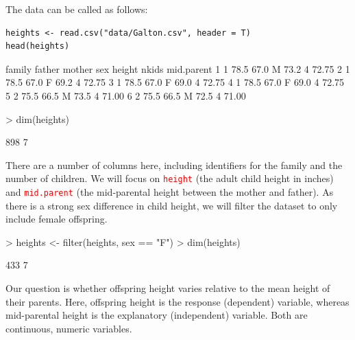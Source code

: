\documentclass[a4paper,12pt]{article}
\newcommand\code[1]{\textcolor{red}{\texttt{#1}}}
\begin{document}
The data can be called as follows:

\begin{shaded}
\begin{verbatim}
heights <- read.csv("data/Galton.csv", header = T)
head(heights)
\end{verbatim}
\begin{Schunk}
\begin{Soutput}
  family father mother sex height nkids mid.parent
1      1   78.5   67.0   M   73.2     4      72.75
2      1   78.5   67.0   F   69.2     4      72.75
3      1   78.5   67.0   F   69.0     4      72.75
4      1   78.5   67.0   F   69.0     4      72.75
5      2   75.5   66.5   M   73.5     4      71.00
6      2   75.5   66.5   M   72.5     4      71.00
\end{Soutput}
\end{Schunk}
\begin{Schunk}
\begin{Sinput}
> dim(heights)
\end{Sinput}
\begin{Soutput}
[1] 898   7
\end{Soutput}
\end{Schunk}
\end{shaded}


There are a number of columns here, including identifiers for the family and the number of children. We will focus on \code{height} (the adult child height in inches) and \code{mid.parent} (the mid-parental height between the mother and father). As there is a strong sex difference in child height, we will filter the dataset to only include female offspring.

\begin{shaded}
\begin{Schunk}
\begin{Sinput}
> heights <- filter(heights, sex == "F")
> dim(heights)
\end{Sinput}
\begin{Soutput}
[1] 433   7
\end{Soutput}
\end{Schunk}
\end{shaded}

Our question is whether offspring height varies relative to the mean height of their parents. Here, offspring height is the response (dependent) variable, whereas mid-parental height is the explanatory (independent) variable. Both are continuous, numeric variables. \\
\end{document}
